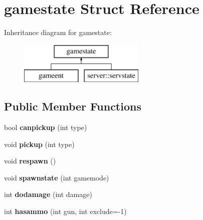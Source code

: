 \hypertarget{structgamestate}{}\section{gamestate Struct Reference}
\label{structgamestate}
Inheritance diagram for gamestate\+:\begin{figure}[H]
\begin{center}
\leavevmode
\includegraphics[height=2.000000cm]{structgamestate}
\end{center}
\end{figure}
\subsection*{Public Member Functions}
\begin{DoxyCompactItemize}
\item 
\mbox{\label{structgamestate_a13710cb67f9834b852ff4d3a56766e43}} 
bool {\bfseries canpickup} (int type)
\item 
\mbox{\label{structgamestate_a43007bc8af87aa01f76d3673280bbb47}} 
void {\bfseries pickup} (int type)
\item 
\mbox{\label{structgamestate_a47090211e18fb02c7316712d9e5c57ea}} 
void {\bfseries respawn} ()
\item 
\mbox{\label{structgamestate_a8172ba069d1f551576a55f6ff36a9dd8}} 
void {\bfseries spawnstate} (int gamemode)
\item 
\mbox{\label{structgamestate_a71220d27f9ae980828d3bdb8cdb6b39e}} 
int {\bfseries dodamage} (int damage)
\item 
\mbox{\label{structgamestate_ae886b4c6a9a222f79357a5f656f2d9f2}} 
int {\bfseries hasammo} (int gun, int exclude=-\/1)
\end{DoxyCompactItemize}
